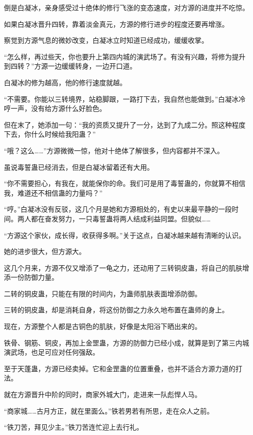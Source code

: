 \begin{this_body}
倒是白凝冰，亲身感受过十绝体的修行飞涨的变态速度，对方源的进度并不吃惊。

如果白凝冰晋升四转，靠着淡金真元，方源的修行进步的程度还要再增涨。

察觉到方源气息的微妙改变，白凝冰立时知道已经成功，缓缓收掌。

“怎么样，再过些天，你也要升上第四内城的演武场了。有没有兴趣，将修为提升到四转？”方源一边缓缓转身，一边开口道。

白凝冰的修为越高，他的修行速度就越。

“不需要。你能以三转境界，站稳脚跟，一路打下去，我自然也能做到。”白凝冰冷哼一声，没有给方源什么好脸色。

但在末了，她添加一句：“我的资质又提升了一分，达到了九成二分。照这种程度下去，你什么时候给我阳蛊？”

“哦？这么……”方源微微一惊，他对十绝体了解很多，但内容都并不深入。

虽说毒誓蛊已经消去，但是白凝冰留着还有大用。

“你不需要担心，有我在，就能保你的命。我们可是用了毒誓蛊的，你就算不相信我，难道还不相信蛊的力量吗？”

“哼。”白凝冰没有反驳，这几个月是她和方源相处的，有史以来最平静的一段时间。两人都在奋发努力，一只毒誓蛊将两人结成利益同盟。但貌似……

“方源这个家伙，成长得，收获得多啊。”关于这点，白凝冰越来越有清晰的认识。

她的进步很大，但方源大。

这几个月来，方源不仅又增添了一龟之力，还动用了三转铜皮蛊，将自己的肌肤增添一份防御力量。

二转的铜皮蛊，只能在有限的时间内，为蛊师肌肤表面增添防御。

三转的铜皮蛊，却是消耗自身，将这份防御之力永久地布置在蛊师的身上。

现在，方源整个人都是古铜色的肌肤，好像是太阳浴下晒出来的。

铁骨、钢筋、铜皮，再加上金罡蛊，方源的防御力已经小成，就算是到了第三内城演武场，也足可应对任何强敌。

至于天蓬蛊，方源已经卖掉。它和金罡蛊的位置重叠，也并不适合方源力道的打法。

就在方源晋升中阶的同时，商家外城大门，走进来一队彪悍人马。

“商家城……古月方正，就在里面么。”铁若男若有所思，走在众人之前。

“铁刀苦，拜见少主。”铁刀苦连忙迎上去行礼。

\end{this_body}

